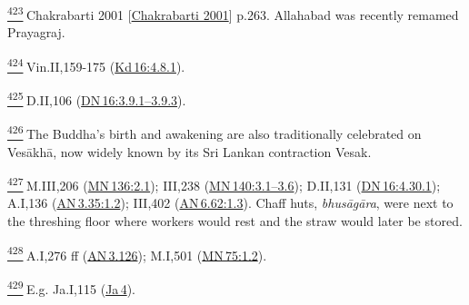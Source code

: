 \label{footprints_split_025.html_fn423}
\hyperref[footprints_split_012.htmlux5cux23fnref423]{\textsuperscript{423}} {Chakrabarti
2001
{{[}\hyperref[footprints_split_022.htmlux5cux23Chakrabartiux5cux25202001]{Chakrabarti
2001}{]}}} p.263. Allahabad was recently remamed Prayagraj.

\label{footprints_split_025.html_fn424}
\hyperref[footprints_split_012.htmlux5cux23fnref424]{\textsuperscript{424}} Vin.II,159-175
(\href{https://suttacentral.net/pli-tv-kd16/en/brahmali?\#4.8.1}{Kd\,16:4.8.1}).

\label{footprints_split_025.html_fn425}
\hyperref[footprints_split_012.htmlux5cux23fnref425]{\textsuperscript{425}} D.II,106
(\href{https://suttacentral.net/dn16/en/sujato\#3.9.1}{DN\,16:3.9.1--3.9.3}).

\label{footprints_split_025.html_fn426}
\hyperref[footprints_split_012.htmlux5cux23fnref426]{\textsuperscript{426}} The
Buddha's birth and awakening are also traditionally celebrated on
Vesākhā, now widely known by its Sri Lankan contraction Vesak.

\label{footprints_split_025.html_fn427}
\hyperref[footprints_split_012.htmlux5cux23fnref427]{\textsuperscript{427}} M.III,206
(\href{https://suttacentral.net/mn136/en/sujato\#2.1}{MN\,136:2.1});
III,238
(\href{https://suttacentral.net/mn140/en/sujato\#3.1}{MN\,140:3.1--3.6});
D.II,131
(\href{https://suttacentral.net/dn16/en/sujato\#4.30.1}{DN\,16:4.30.1});
A.I,136
(\href{https://suttacentral.net/an3.35/en/sujato\#1.2}{AN\,3.35:1.2});
III,402
(\href{https://suttacentral.net/an6.62/en/sujato\#1.3}{AN\,6.62:1.3}).
Chaff huts, \emph{bhusāgāra}, were next to the threshing floor where
workers would rest and the straw would later be stored.

\label{footprints_split_025.html_fn428}
\hyperref[footprints_split_012.htmlux5cux23fnref428]{\textsuperscript{428}} A.I,276
ff (\href{https://suttacentral.net/an3.126/en/sujato}{AN\,3.126});
M.I,501
(\href{https://suttacentral.net/mn75/en/sujato\#1.2}{MN\,75:1.2}).

\label{footprints_split_025.html_fn429}
\hyperref[footprints_split_012.htmlux5cux23fnref429]{\textsuperscript{429}} E.g.
Ja.I,115 (\href{https://suttacentral.net/ja4}{Ja\,4}).

